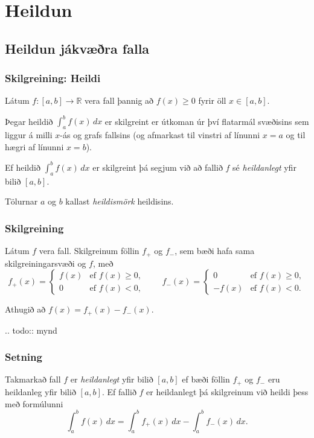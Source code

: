 \documentclass[icelandic,a4paper,12pt]{article}
\date{29. ágúst 2015}
\newcommand{\R}{{\mathbb  R}}
\begin{document}
\setcounter{tocdepth}{2}
\tableofcontents

\section{Heildun}
\subsection{Heildun jákvæðra falla}
\subsubsection{Skilgreining: Heildi}   
Látum $f:[a,b]\rightarrow \R$ 
vera fall þannig að $f(x)\geq 0$ fyrir öll
$x\in[a,b]$.  

Þegar heildið $\int_a^b f(x)\,dx$ er skilgreint er útkoman úr
því flatarmál svæðisins sem liggur á milli $x$-ás og grafs fallsins
(og afmarkast til vinstri af línunni $x=a$ og til hægri af línunni
$x=b$).   

Ef heildið  $\int_a^b f(x)\,dx$ er skilgreint þá segjum við
að fallið $f$ sé \emph{heildanlegt} yfir bilið $[a,b]$. 

Tölurnar $a$ og $b$ kallast \emph{heildismörk} heildisins.

\subsubsection{Skilgreining}   
Látum $f$ vera fall.  
Skilgreinum föllin $f_+$
og $f_-$, sem bæði hafa sama skilgreiningarsvæði og $f$, með
$$
  f_+(x)=\left\{\begin{array}{ll} f(x) & \mbox{ef }f(x)\geq 0,\\
  0 & \mbox{ef }f(x)<0, \end{array} \right. \qquad
  f_-(x)=\left\{\begin{array}{ll} 0 & \mbox{ef }f(x)\geq 0,\\
  -f(x) & \mbox{ef }f(x)<0. \end{array}\right.
$$

Athugið að $f(x)=f_+(x)-f_-(x)$.

.. todo::
  mynd

\subsubsection{Setning} 
Takmarkað fall $f$ er \emph{heildanlegt} yfir bilið
$[a, b]$ ef bæði föllin $f_+$ og $f_-$ eru heildanleg yfir bilið $[a,
b]$.  Ef fallið $f$ er heildanlegt þá skilgreinum við heildi þess með
formúlunni
$$\int_a^b f(x)\,dx=\int_a^b f_+(x)\,dx-\int_a^b f_-(x)\,dx.$$
\end{document}
